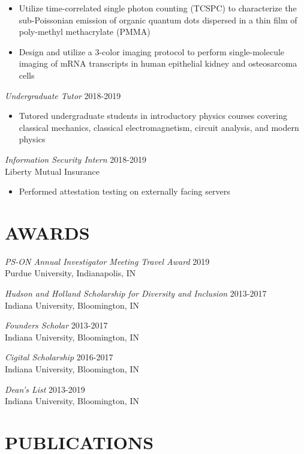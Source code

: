 \documentclass[margin, 10pt]{res} %
\begin{document}
\begin{resume}
\begin{itemize}
\item Utilize time-correlated single photon counting (TCSPC) to characterize the sub-Poissonian emission of organic quantum dots dispersed in a thin film of poly-methyl methacrylate (PMMA)

\item Design and utilize a 3-color imaging protocol to perform single-molecule imaging of mRNA transcripts in human epithelial kidney and osteosarcoma cells 

\end{itemize} 


{\sl Undergraduate Tutor} \hfill 2018-2019
\begin{itemize} \itemsep -2pt %

\item Tutored undergraduate students in introductory physics courses covering classical mechanics, classical electromagnetism, circuit analysis, and modern physics

\end{itemize} 
\vspace{1in}
{\sl Information Security Intern} \hfill 2018-2019\\
Liberty Mutual Insurance
\begin{itemize} \itemsep -2pt %

\item Performed attestation testing on externally facing servers

\end{itemize} 


\section{AWARDS}

{\sl PS-ON Annual Investigator Meeting Travel Award} \hfill 2019 \\
Purdue University, Indianapolis, IN 

{\sl Hudson and Holland Scholarship for Diversity and Inclusion} \hfill 2013-2017 \\
Indiana University, Bloomington, IN 

{\sl Founders Scholar} \hfill 2013-2017 \\
Indiana University, Bloomington, IN 

{\sl Cigital Scholarship} \hfill 2016-2017 \\
Indiana University, Bloomington, IN 

{\sl Dean’s List} \hfill 2013-2019 \\
Indiana University, Bloomington, IN 

\section{PUBLICATIONS}


\end{resume}
\end{document}
